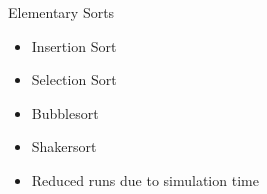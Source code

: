 \begin{slide}
\begin{stitle}
Elementary Sorts
\end{stitle}

\begin{itemize}
\item Insertion Sort
\item Selection Sort
\item Bubblesort
\item Shakersort
\item Reduced runs due to simulation time
\end{itemize}

\end{slide}
